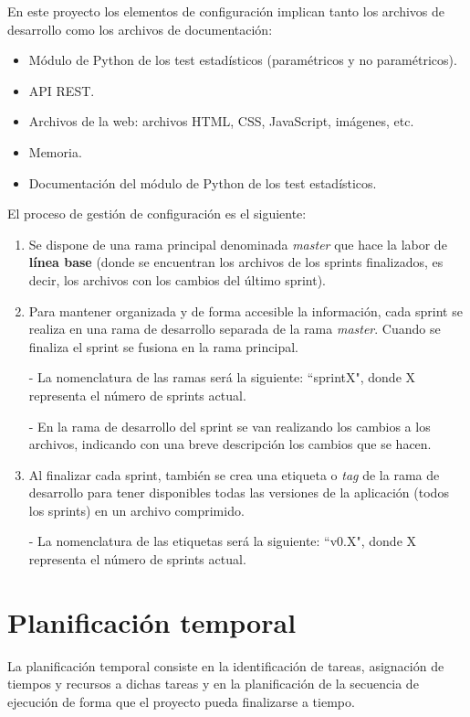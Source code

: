 \noindent
En este proyecto los elementos de configuración implican tanto los archivos de desarrollo como los archivos de documentación:
\begin{itemize}
\item Módulo de Python de los test estadísticos (paramétricos y no paramétricos).
\item API REST.
\item Archivos de la web: archivos HTML, CSS, JavaScript, imágenes, etc.
\item Memoria.
\item Documentación del módulo de Python de los test estadísticos.
\end{itemize}

\noindent
El proceso de gestión de configuración es el siguiente:
\begin{enumerate}
\item Se dispone de una rama principal denominada \textit{master} que hace la labor de \textbf{línea base} (donde se encuentran los archivos de los sprints finalizados, es decir, los archivos con los cambios del último sprint).
\item Para mantener organizada y de forma accesible la información, cada sprint se realiza en una rama de desarrollo separada de la rama \textit{master}. Cuando se finaliza el sprint se fusiona en la rama principal.

- La nomenclatura de las ramas será la siguiente: ``sprintX", donde X representa el número de sprints actual.

- En la rama de desarrollo del sprint se van realizando los cambios a los archivos, indicando con una breve descripción los cambios que se hacen.
\item Al finalizar cada sprint, también se crea una etiqueta o \textit{tag} de la rama de desarrollo para tener disponibles todas las versiones de la aplicación (todos los sprints) en un archivo comprimido.

- La nomenclatura de las etiquetas será la siguiente: ``v0.X", donde X representa el número de sprints actual.
\end{enumerate}

\section{Planificación temporal}
La planificación temporal consiste en la identificación de tareas, asignación de tiempos y recursos a dichas tareas y en la planificación de la secuencia de ejecución de forma que el proyecto pueda finalizarse a tiempo. 

